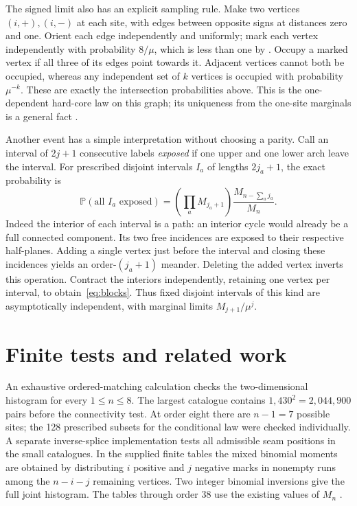 \documentclass[11pt]{article}
\newcommand{\Prb}{\mathbb P}
\begin{document}
The signed limit also has an explicit sampling rule. Make two vertices
\((i,+),(i,-)\) at each site, with edges between opposite signs at
distances zero and one. Orient each edge independently and uniformly;
mark each vertex independently with probability \(8/\mu\), which is
less than one by \cite{AP}. Occupy a marked vertex if all three of
its edges point towards it. Adjacent vertices cannot both be occupied,
whereas any independent set of \(k\) vertices is occupied with
probability \(\mu^{-k}\). These are exactly the intersection
probabilities above. This is the one-dependent hard-core law on this
graph; its uniqueness from the one-site marginals is a general fact
\cite[Lemma~23]{HL}.

Another event has a simple interpretation without choosing a parity.
Call an interval of \(2j+1\) consecutive labels \emph{exposed} if
one upper and one lower arch leave the interval. For prescribed
disjoint intervals \(I_a\) of lengths \(2j_a+1\), the exact probability is
\begin{equation}\label{eq:blocks}
 \Prb(\text{all }I_a\text{ exposed})
    =\left(\prod_a M_{j_a+1}\right)\frac{M_{n-\sum_a j_a}}{M_n}.
\end{equation}
Indeed the interior of each interval is a path: an interior cycle would
already be a full connected component. Its two free incidences are
exposed to their respective half-planes. Adding a single vertex just
before the interval and closing these incidences yields an order-\((j_a+1)\)
meander. Deleting the added vertex inverts this operation. Contract
the interiors independently, retaining one vertex per interval, to
obtain~\eqref{eq:blocks}. Thus fixed disjoint intervals of this kind
are asymptotically independent, with marginal limits \(M_{j+1}/\mu^j\).












\section{Finite tests and related work}
An exhaustive ordered-matching calculation checks the two-dimensional
histogram for every \(1\le n\le8\). The largest catalogue contains
\(1{,}430^2=2{,}044{,}900\) pairs before the connectivity test.
At order eight there are \(n-1=7\) possible sites; the 128 prescribed
subsets for the conditional law were checked individually.
A separate inverse-splice implementation tests all admissible seam
positions in the small catalogues. In the supplied finite tables the
mixed binomial moments are obtained by distributing \(i\) positive
and \(j\) negative marks in nonempty runs among the \(n-i-j\)
remaining vertices. Two integer binomial inversions give the full
joint histogram. The tables through order 38 use the existing
values of \(M_n\) \cite{OEIS}.
\end{document}
